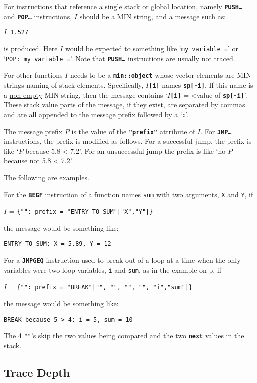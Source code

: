 \documentclass[12pt]{article}
\newcommand{\TT}[1]{{\tt \bfseries #1}}
\newcommand{\pagref}[1]{p\pageref{#1}}
\begin{document}
For instructions that reference a single stack or global location,
namely \TT{PUSH\ldots} and \TT{POP\ldots} instructions,
$I$ should be a MIN string, and a message such
as:
\begin{center}
\tt $I$ 1.527
\end{center}
is produced.  Here $I$ would be expected to something
like `{\tt my variable =}' or `{\tt POP: my variable =}'.
Note that \TT{PUSH\ldots} instructions are usually
\underline{not} traced.

For other functions $I$ needs to be a \TT{min::object}
whose vector elements are MIN strings naming of stack
elements.  Specifically, $I$\TT{[i]} names \TT{sp[-i]}.
If this name is a \underline{non-empty} MIN string,
then the message contains `$I$\TT{[i]} = <value of \TT{sp[-i]}'.
These stack value parts of the message, if they exist, are separated
by commas and are all appended to the message prefix followed by a `\TT{:}'.

The message prefix $P$ is the value of the \TT{"prefix"} attribute
of $I$.  For \TT{JMP\ldots} instructions, the prefix is modified as
follows.  For a successful jump, the prefix is like
`$P$ because 5.8 < 7.2'.  For an unsuccessful jump the prefix
is like `no $P$ because not 5.8 < 7.2'.

The following are examples.

For the \TT{BEGF} instruction of a function names {\tt sum} with
two arguments, {\tt X} and {\tt Y}, if
\begin{center}
$I$ = {\tt \{"": prefix = "ENTRY TO SUM"|"X","Y"|\}}
\end{center}
the message would be something like:
\begin{center}
\tt ENTRY TO SUM: X = 5.89, Y = 12
\end{center}

For a \TT{JMPGEQ} instruction used to break out of a loop
at a time when the only variables were two loop variables,
{\tt i} and {\tt sum}, as in the example on \pagref{EXAMPLE-LOOP}, if
\begin{center}
$I$ = {\tt \{"": prefix = "BREAK"|"", "", "", "", "i","sum"|\}}
\end{center}
the message would be something like:
\begin{center}
\tt BREAK because 5 > 4: i = 5, sum = 10
\end{center}
The 4 {\tt ""}'s skip the two values being compared and the two \TT{next}
values in the stack.

\subsection{Trace Depth}
\label{TRACE-DEPTH}
\end{document}

